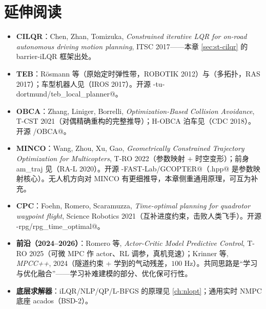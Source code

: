 \section*{延伸阅读}
\begin{itemize}
  \item \textbf{CILQR}：Chen, Zhan, Tomizuka, \emph{Constrained iterative LQR for on-road autonomous driving motion planning}, ITSC 2017\cite{chen2017cilqr}——本章 \cref{sec:st-cilqr} 的 barrier-iLQR 框架出处。
  \item \textbf{TEB}：Rösmann 等\cite{rosmann2012teb}（原始定时弹性带，ROBOTIK 2012）与\cite{rosmann2017teb}（多拓扑，RAS 2017）；车型机器人见\cite{rosmann2017carlike}（IROS 2017）。开源 \verb@rst-tu-dortmund/teb_local_planner@。
  \item \textbf{OBCA}：Zhang, Liniger, Borrelli, \emph{Optimization-Based Collision Avoidance}, T-CST 2021\cite{zhang2021obca}（对偶精确重构的完整推导）；H-OBCA 泊车见\cite{zhang2018hobca}（CDC 2018）。开源 \verb@XiaojingGeorgeZhang/OBCA@。
  \item \textbf{MINCO}：Wang, Zhou, Xu, Gao, \emph{Geometrically Constrained Trajectory Optimization for Multicopters}, T-RO 2022\cite{wang2022minco}（参数映射 + 时空变形）；前身 am\_traj 见\cite{wang2020amtraj}（RA-L 2020）。开源 \verb@ZJU-FAST-Lab/GCOPTER@（\verb@minco.hpp@ 是参数映射核心）。无人机方向对 MINCO 有更细推导，本章侧重通用原理，可互为补充。
  \item \textbf{CPC}：Foehn, Romero, Scaramuzza, \emph{Time-optimal planning for quadrotor waypoint flight}, Science Robotics 2021\cite{foehn2021cpc}（互补进度约束，击败人类飞手）。开源 \verb@uzh-rpg/rpg_time_optimal@。
  \item \textbf{前沿（2024--2026）}：Romero 等, \emph{Actor-Critic Model Predictive Control}, T-RO 2025\cite{romero2025actorcritic}（可微 MPC 作 actor、RL 调参，真机竞速）；Krinner 等, \emph{MPCC++}, 2024\cite{krinner2024mpccpp}（隧道约束 + 学到的气动残差，$100$ Hz）。共同思路是“学习与优化融合”——学习补难建模的部分、优化保可行性。
  \item \textbf{底层求解器}：iLQR/NLP/QP/L-BFGS 的原理见 \cref{ch:nlopt}；通用实时 NMPC 底座 acados（BSD-2）。
\end{itemize}

